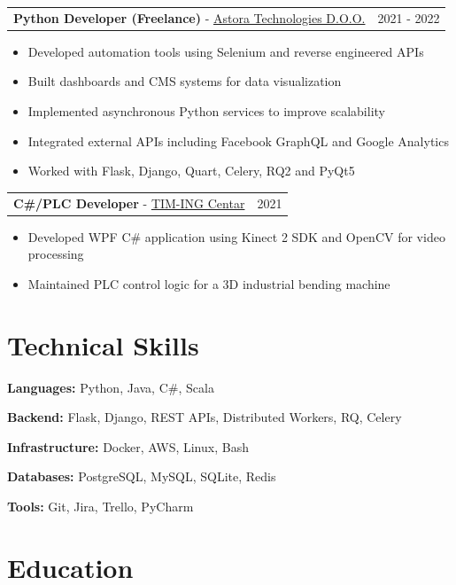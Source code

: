 \documentclass[11pt,a4paper]{article}
\makeatletter
\newcommand{\cventry}[2]{%
\noindent
\begin{tabular*}{\textwidth}{@{}p{0.8\textwidth}@{\extracolsep{\fill}}r@{}}
#1 & #2 \\
\end{tabular*}
}
\makeatother
\begin{document}
\vspace{4pt}

\cventry{\textbf{Python Developer (Freelance)} - \href{https://astora.rs/}{Astora Technologies D.O.O.}}{2021 - 2022}%
\begin{itemize}[leftmargin=*,itemsep=2pt,topsep=0pt,partopsep=0pt,parsep=0pt]
\item Developed automation tools using Selenium and reverse engineered APIs
\item Built dashboards and CMS systems for data visualization
\item Implemented asynchronous Python services to improve scalability
\item Integrated external APIs including Facebook GraphQL and Google Analytics
\item Worked with Flask, Django, Quart, Celery, RQ2 and PyQt5
\end{itemize}

\vspace{4pt}

\cventry{\textbf{C\#/PLC Developer} - \href{https://www.tim-ing.com/rs/}{TIM-ING Centar}}{2021}%
\begin{itemize}[leftmargin=*,itemsep=2pt,topsep=0pt,partopsep=0pt,parsep=0pt]
\item Developed WPF C\# application using Kinect 2 SDK and OpenCV for video processing
\item Maintained PLC control logic for a 3D industrial bending machine
\end{itemize}


\section*{Technical Skills}

\textbf{Languages:} Python, Java, C\#, Scala

\textbf{Backend:} Flask, Django, REST APIs, Distributed Workers, RQ, Celery

\textbf{Infrastructure:} Docker, AWS, Linux, Bash

\textbf{Databases:} PostgreSQL, MySQL, SQLite, Redis

\textbf{Tools:} Git, Jira, Trello, PyCharm


\section*{Education}
\end{document}
